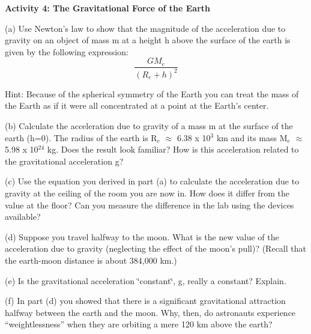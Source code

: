 \textbf{Activity 4: The Gravitational Force of the Earth}

(a) Use Newton's law to show that the magnitude of the acceleration due to gravity
on an object of mass m at a height h above the surface of the earth is given by
the following expression:
\[
\frac{GM_{e}}{\left( R_{e}+h\right) ^{2}}\]

Hint: Because of the spherical symmetry of the Earth you can treat the mass
of the Earth as if it were all concentrated at a point at the Earth's center.
\answerspace{20mm}
\pagebreak

(b) Calculate the acceleration due to gravity of a mass m at the surface of
the earth (h=0). The radius of the earth is R\( _{e} \) \( \approx  \) 6.38
x 10\( ^{3} \) km and its mass M\( _{e} \) \( \approx  \) 5.98 x 10\( ^{24} \)
kg. Does the result look familiar? How is this acceleration related to the gravitational
acceleration g?
\vspace{40mm}

(c) Use the equation you derived in part (a) to calculate the acceleration due
to gravity at the ceiling of the room you are now in. How does it differ from
the value at the floor? Can you measure the difference in the lab using the
devices available?
\vspace{30mm}

(d) Suppose you travel halfway to the moon. What is the new value of the acceleration due to gravity (neglecting the effect of the moon's pull)? (Recall that the earth-moon distance is about 384,000 km.)
\vspace{30mm}

(e) Is the gravitational acceleration \char`\"{}constant\char`\"{}, g, really
a constant? Explain.
\vspace{30mm}

(f) In part (d) you showed that there is a significant gravitational attraction
halfway between the earth and the moon. Why, then, do astronauts experience
``weightlessness'' when they are orbiting a mere 120 km above the earth?

